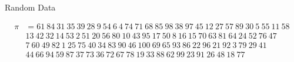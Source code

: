 \documentclass[xcolor=table,dvipsnames]{beamer}
\begin{document}
  \begin{frame}{Random Data}
    \begin{center}
      \pause
      \hspace{4pt}
      \raisebox{5pc}{$\sim$}
      \hspace{4pt}
    \end{center}
    \pause
    { \scriptsize
    $$ \begin{aligned}\pi &= 
        61\ 84\ 31\ 35\ 39\ 28\ 9\ 54\ 6\ 4\ 74\ 71\ 68\ 85\ 98\ 38\ 97\ 45\ 12\
        27\ 57\ 89\ 30\ 5\ 55\ 11\ 58\ \\
        &13\ 42\ 32\ 14\ 53\ 2\ 51\ 20\ 56\ 80\ 10\ 43\ 95\ 17\ 50\ 8\ 16\ 15\ 70\
        63\ 81\ 64\ 24\ 52\ 76\ 47\ \\
        &7\ 60\ 49\ 82\ 1\ 25\ 75\ 40\ 34\ 83\ 90\ 46\ 100\ 69\ 65\ 93\ 86\ 22\
        96\ 21\ 92\ 3\ 79\ 29\ 41\  \\
        &44\ 66\ 94\ 59\ 87\ 37\ 73\ 36\ 72\ 67\ 78\ 19\ 33\ 88\ 62\ 99\ 23\ 91\
        26\ 48\ 18\ 77
    \end{aligned}$$
    }
  \end{frame}
\end{document}
